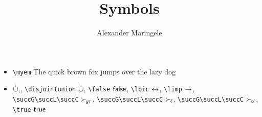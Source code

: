 \documentclass[]{clseminar}
\begin{document}
    
    \author{Alexander Maringele}
    \title{Symbols}
    
    \maketitle

    \newcommand{\demo}[1]{$#1$}

    \begin{itemize}
        \item \verb+\myem+ \myem The quick brown fox jumps over the lazy dog
        \item 
        \demo{\disjointunion},,
        \verb+\disjointunion+ 
        $\mathop{\dot\cup}$, 
        \verb+\false+ 
        $\mathsf{false}$,
        \verb+\lbic+ 
        $\leftrightarrow$,  
        \verb+\limp+ 
        $\rightarrow$,  
        \verb+\succG\succL\succC+
        $\mathrel\succ_{\!gr}$,   
        \verb+\succG\succL\succC+
        $\mathrel\succ_{\!\ell}$,   
        \verb+\succG\succL\succC+
        $\mathrel\succ_{\!cl}$, 
        \verb+\true+ $\mathsf{true}$

    \end{itemize}



    
        
    
\end{document}
